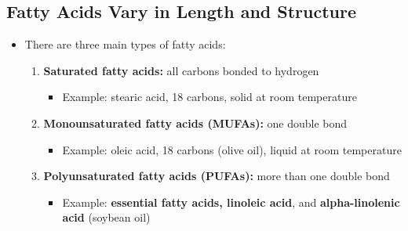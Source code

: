 \documentclass[12pt]{article}
\begin{document}
        \subsection{Fatty Acids Vary in Length and Structure}
            \begin{itemize}
                \item There are three main types of fatty acids:
                    \begin{enumerate}
                        \item \textbf{Saturated fatty acids:} all carbons bonded to hydrogen
                            \begin{itemize}
                                \item Example: stearic acid, 18 carbons, solid at room temperature
                            \end{itemize}
                        \item \textbf{Monounsaturated fatty acids (MUFAs):} one double bond
                            \begin{itemize}
                                \item Example: oleic acid, 18 carbons (olive oil), liquid at room temperature
                            \end{itemize}
                        \item \textbf{Polyunsaturated fatty acids (PUFAs):} more than one double bond
                            \begin{itemize}
                                \item Example: \textbf{essential fatty acids, linoleic acid}, and \textbf{alpha-linolenic acid} (soybean oil)
                            \end{itemize}
                    \end{enumerate}
            \end{itemize}
\end{document}
